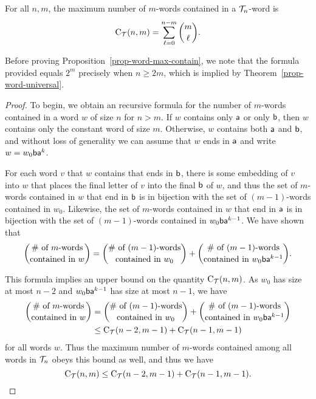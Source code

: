 \begin{proposition}
\label{prop-word-max-contain}
For all $n, m$, the maximum number of $m$-words contained in a $\mathcal{T}_n$-word is
\[
    \operatorname{C}_{\mathcal{T}}(n,m) 
    = 
    \sum_{\ell = 0}^{n-m} \binom{m}{\ell}.
\]
\end{proposition}
Before proving Proposition~\ref{prop-word-max-contain}, we note that the formula provided equals $2^{m}$ precisely when $n \ge 2m$, which is implied by Theorem~\ref{prop-word-universal}.
\begin{proof}
To begin, we obtain an recursive formula for the number of $m$-words contained in a word $w$ of size $n$ for $n > m$. If $w$ contains only $\textsf{a}$ or only $\textsf{b}$, then $w$ contains only the constant word of size $m$. Otherwise, $w$ contains both $\textsf{a}$ and $\textsf{b}$, and without loss of generality we can assume that $w$ ends in $\textsf{a}$ and write $w = w_0 \textsf{b} \textsf{a}^k$. 

For each word $v$ that $w$ contains that ends in $\textsf{b}$, there is some embedding of $v$ into $w$ that places the final letter of $v$ into the final $\textsf{b}$ of $w$, and thus the set of $m$-words contained in $w$ that end in $\textsf{b}$ is in bijection with the set of $(m-1)$-words contained in $w_0$. Likewise, the set of $m$-words contained in $w$ that end in $\textsf{a}$ is in bijection with the set of $(m-1)$-words contained in $w_0 \textsf{b} \textsf{a}^{k-1}$. %
We have shown that 
\[
    \binom{\text{$\#$ of $m$-words}}{\text{contained in $w$}}
    =
    \binom{\text{$\#$ of $(m-1)$-words}}{\text{contained in $w_0$}}
    +
    \binom{\text{$\#$ of $(m-1)$-words}}{\text{contained in $w_0 \textsf{b} \textsf{a}^{k-1}$}}.
\]

This formula implies an upper bound on the quantity $\operatorname{C}_{\mathcal{T}}(n,m)$. As $w_0$ has size at most $n-2$ and $w_0 \textsf{b} \textsf{a}^{k-1}$ has size at most $n-1$, we have
\begin{align*}
    \binom{\text{$\#$ of $m$-words}}{\text{contained in $w$}}
        &= \binom{\text{$\#$ of $(m-1)$-words}}{\text{contained in $w_0$}}
         + \binom{\text{$\#$ of $(m-1)$-words}}{\text{contained in $w_0 \textsf{b} \textsf{a}^{k-1}$}} \\
        &\le \operatorname{C}_{\mathcal{T}}(n-2,m-1) + \operatorname{C}_{\mathcal{T}}(n-1,m-1)
\end{align*}
for all words $w$. Thus the maximum number of $m$-words contained among all words in $\mathcal{T}_n$ obeys this bound as well, and thus we have
\[
    \operatorname{C}_{\mathcal{T}}(n,m)
    \le
    \operatorname{C}_{\mathcal{T}}(n-2,m-1) + \operatorname{C}_{\mathcal{T}}(n-1,m-1).
\]


\end{proof}
